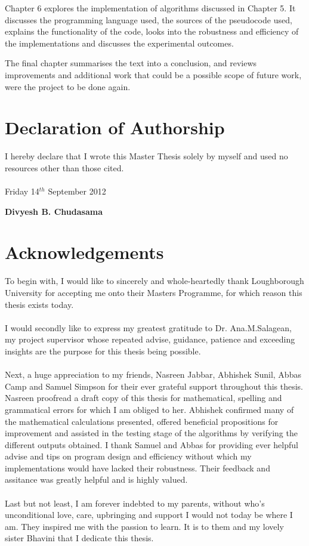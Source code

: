 \documentclass[iwp,first]{luthesis}
\begin{document}
Chapter 6 explores the implementation of algorithms discussed in Chapter 5. It discusses the programming language used, the sources of the pseudocode used, explains the functionality of the code, looks into the robustness and efficiency of the implementations and discusses the experimental outcomes.

The final chapter summarises the text into a conclusion, and reviews improvements and additional work that could be a possible scope of future work, were the project to be done again. 

\chapter{Declaration of Authorship}

I hereby declare that I wrote this Master Thesis solely by myself and used no resources other than those cited.
\\
\\
Friday 14$^{th}$ September 2012
\begin{flushright}{\textbf{Divyesh B. Chudasama}}
\end{flushright}

\chapter{Acknowledgements}

To begin with, I would like to sincerely and whole-heartedly thank Loughborough University for accepting me onto their Masters Programme, for which reason this thesis exists today.
\\
\\
I would secondly like to express my greatest gratitude to Dr. Ana.M.Salagean, my project supervisor whose repeated advise, guidance, patience and exceeding insights are the purpose for this thesis being possible. 
\\
\\
Next, a huge appreciation to my friends, Nasreen Jabbar, Abhishek Sunil, Abbas Camp and Samuel Simpson for their ever grateful support throughout this thesis. Nasreen proofread a draft copy of this thesis for mathematical, spelling and grammatical errors for which I am obliged to her. Abhishek confirmed many of the mathematical calculations presented, offered beneficial propositions for improvement and assisted in the testing stage of the algorithms by verifying the different outputs obtained. I thank Samuel and Abbas for providing ever helpful advise and tips on program design and efficiency without which my implementations would have lacked their robustness. Their feedback and assitance was greatly helpful and is highly valued. 
\\
\\
Last but not least, I am forever indebted to my parents, without who's unconditional love, care, upbringing and support I would not today be where I am. They inspired me with the passion to learn. It is to them and my lovely sister Bhavini that I dedicate this thesis.
\end{document}
